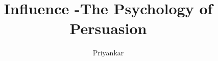 \documentclass{notestyle}
\title{Influence -The Psychology of Persuasion}
\author{Priyankar}
\begin{document}
\maketitle
\tableofcontents
\clearpage









\nocite{*}
\end{document}
